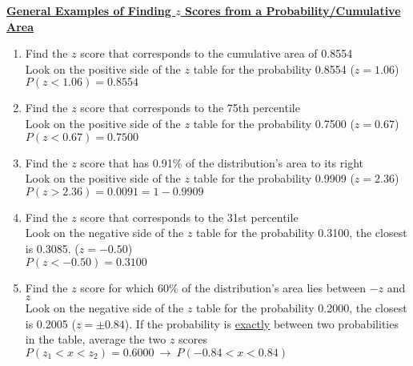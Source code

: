 \documentclass[a4paper]{article}
\let\bf\textbf
\begin{document}
\begin{shaded}
    \underline{\bf{General Examples of Finding $z$ Scores from a Probability/Cumulative Area}}
    \begin{enumerate}
        \item Find the $z$ score that corresponds to the cumulative area of 0.8554
        \vspace{1mm}\\
        Look on the positive side of the $z$ table for the probability 0.8554 ($z = 1.06$)\\
        $P(z < 1.06) = 0.8554$
        \item Find the $z$ score that corresponds to the 75th percentile
        \vspace{1mm}\\
        Look on the positive side of the $z$ table for the probability 0.7500 ($z = 0.67$)\\
        $P(z < 0.67) = 0.7500$
        \item Find the $z$ score that has 0.91\% of the distribution's area to its right
        \vspace{1mm}\\
        Look on the positive side of the $z$ table for the probability 0.9909 ($z = 2.36$)\\
        $P(z > 2.36) = 0.0091 = 1 - 0.9909$
        \item Find the $z$ score that corresponds to the 31st percentile
        \vspace{1mm}\\
        Look on the negative side of the $z$ table for the probability 0.3100, the closest is 0.3085. ($z = -0.50$)\\
        $P(z < -0.50) = 0.3100$
        \item Find the $z$ score for which 60\% of the distribution's area lies between $-z$ and $z$
        \vspace{1mm}\\
        Look on the negative side of the $z$ table for the probability 0.2000, the closest is 0.2005 ($z = \pm 0.84$). If the probability is \underline{exactly} between two probabilities in the table, average the two $z$ scores
        \vspace{0.5mm}\\
        $P(z_1 < x < z_2) = 0.6000\ \to\ P(-0.84 < x < 0.84)$
    \end{enumerate}
\end{shaded}
\end{document}

